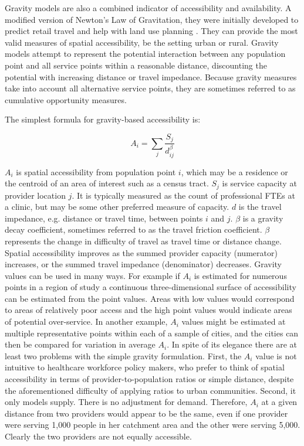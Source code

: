 
Gravity models are also a combined indicator of accessibility and availability. A modified version of Newton's Law of Gravitation, they were initially developed to predict retail travel \cite{reilly_law_1931} and help with land use planning \cite{hansen_how_1959}. They can provide the most valid measures of spatial accessibility, be the setting urban or rural. Gravity models attempt to represent the potential interaction between any population point and all service points within a reasonable distance, discounting the potential with increasing distance or travel impedance. Because gravity measures take into account all alternative service points, they are sometimes referred to as cumulative opportunity measures.

The simplest formula for gravity-based accessibility is:

\begin{equation}
    A_i = \sum_j \frac{S_j}{d_{ij}^{\beta}}
\end{equation}

$A_i$ is spatial accessibility from population point $i$, which may be a residence or the centroid of an area of interest such as a census tract. $S_j$ is service capacity at provider location $j$. It is typically measured as the count of professional FTEs at a clinic, but may be some other preferred measure of capacity. $d$ is the travel impedance, e.g. distance or travel time, between points $i$ and $j$. $\beta$ is a gravity decay coefficient, sometimes referred to as the travel friction coefficient. $\beta$ represents the change in difficulty of travel as travel time or distance change. Spatial accessibility improves as the summed provider capacity (numerator) increases, or the summed travel impedance (denominator) decreases. Gravity values can be used in many ways. For example if $A_i$ is estimated for numerous points in a region of study a continuous three-dimensional surface of accessibility can be estimated from the point values. Areas with low values would correspond to areas of relatively poor access and the high point values would indicate areas of potential over-service. In another example, $A_i$ values might be estimated at multiple representative points within each of a sample of cities, and the cities can then be compared for variation in average $A_i$. In spite of its elegance there are at least two problems with the simple gravity formulation. First, the $A_i$ value is not intuitive to healthcare workforce policy makers, who prefer to think of spatial accessibility in terms of provider-to-population ratios or simple distance, despite the aforementioned difficulty of applying ratios to urban communities. Second, it only models supply. There is no adjustment for demand. Therefore, $A_i$ at a given distance from two providers would appear to be the same, even if one provider were serving 1,000 people in her catchment area and the other were serving 5,000. Clearly the two providers are not equally accessible.

